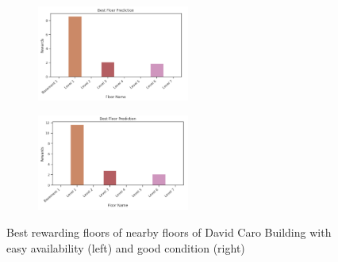 \begin{itemize}
\begin{figure}[H]
\centering
\begin{subfigure}[b]{0.30\textwidth}
  \centering
  \includegraphics[width=5cm,keepaspectratio=true]{resources/images/floor_to/dcaro_easyava.png}
\end{subfigure}
\begin{subfigure}[b]{0.30\textwidth}
  \centering
  \includegraphics[width=5cm,keepaspectratio=true]{resources/images/floor_to/dcaro_good.png}
\end{subfigure}

\caption{Best rewarding floors of nearby floors of David Caro Building with easy availability (left) and good condition (right)}
\label{fig:dcaro-other-factors}
\end{figure}

\end{itemize}

    
